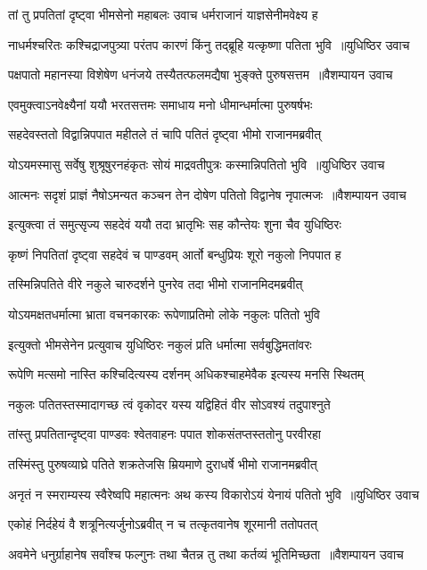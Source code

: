 \twolineshloka
{तां तु प्रपतितां दृष्ट्वा भीमसेनो महाबलः}
{उवाच धर्मराजानं याज्ञसेनीमवेक्ष्य ह}


\threelineshloka
{नाधर्मश्चरितः कश्चिद्राजपुत्र्या परंतप}
{कारणं किंनु तद्ब्रूहि यत्कृष्णा पतिता भुवि ॥युधिष्ठिर उवाच}
{}


\threelineshloka
{पक्षपातो महानस्या विशेषेण धनंजये}
{तस्यैतत्फलमद्यैषा भुङ्क्ते पुरुषसत्तम ॥वैशम्पायन उवाच}
{}


\twolineshloka
{एवमुक्त्वाऽनवेक्ष्यैनां ययौ भरतसत्तमः}
{समाधाय मनो धीमान्धर्मात्मा पुरुषर्षभः}


\twolineshloka
{सहदेवस्ततो विद्वान्निपपात महीतले}
{तं चापि पतितं दृष्ट्वा भीमो राजानमब्रवीत्}


\threelineshloka
{योऽयमस्मासु सर्वेषु शुश्रूषुरनहंकृतः}
{सोयं माद्रवतीपुत्रः कस्मान्निपतितो भुवि ॥युधिष्ठिर उवाच}
{}


\threelineshloka
{आत्मनः सदृशं प्राज्ञं नैषोऽमन्यत कञ्चन}
{तेन दोषेण पतितो विद्वानेष नृपात्मजः ॥वैशम्पायन उवाच}
{}


\twolineshloka
{इत्युक्त्वा तं समुत्सृज्य सहदेवं ययौ तदा}
{भ्रातृभिः सह कौन्तेयः शुना चैव युधिष्ठिरः}


\twolineshloka
{कृष्णं निपतितां दृष्ट्वा सहदेवं च पाण्डवम्}
{आर्तो बन्धुप्रियः शूरो नकुलो निपपात ह}


\twolineshloka
{तस्मिन्निपतिते वीरे नकुले चारुदर्शने}
{पुनरेव तदा भीमो राजानमिदमब्रवीत्}


\twolineshloka
{योऽयमक्षतधर्मात्मा भ्राता वचनकारकः}
{रूपेणाप्रतिमो लोके नकुलः पतितो भुवि}


\twolineshloka
{इत्युक्तो भीमसेनेन प्रत्युवाच युधिष्ठिरः}
{नकुलं प्रति धर्मात्मा सर्वबुद्धिमतांवरः}


\twolineshloka
{रूपेणि मत्समो नास्ति कश्चिदित्यस्य दर्शनम्}
{अधिकश्चाहमेवैक इत्यस्य मनसि स्थितम्}


\twolineshloka
{नकुलः पतितस्तस्मादागच्छ त्वं वृकोदर}
{यस्य यद्विहितं वीर सोऽवश्यं तदुपाश्नुते}


\twolineshloka
{तांस्तु प्रपतितान्दृष्ट्वा पाण्डवः श्वेतवाहनः}
{पपात शोकसंतप्तस्ततोनु परवीरहा}


\twolineshloka
{तस्मिंस्तु पुरुषव्याघ्रे पतिते शक्रतेजसि}
{म्रियमाणे दुराधर्षे भीमो राजानमब्रवीत्}


\threelineshloka
{अनृतं न स्मराम्यस्य स्वैरेष्वपि महात्मनः}
{अथ कस्य विकारोऽयं येनायं पतितो भुवि ॥युधिष्ठिर उवाच}
{}


\twolineshloka
{एकोहं निर्दहेयं वै शत्रूनित्यर्जुनोऽब्रवीत्}
{न च तत्कृतवानेष शूरमानी ततोपतत्}


\threelineshloka
{अवमेने धनुर्ग्राहानेष सर्वांश्च फल्गुनः}
{तथा चैतन्न तु तथा कर्तव्यं भूतिमिच्छता ॥वैशम्पायन उवाच}
{}


